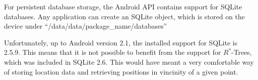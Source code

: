 For persistent database storage, the Android API contains
support for SQLite databases. Any application can create
an SQLite object, which is stored on the device under
``/data/data/package\_name/databases''

Unfortunately, up to Android version 2.1, the installed
support for SQLite is 2.5.9. This means that it is not
possible to benefit from the support for $R^*$-Trees,
which was included in SQLite 2.6. This would have meant
a very comfortable way of storing location data and
retrieving positions in vincinity of a given point.

